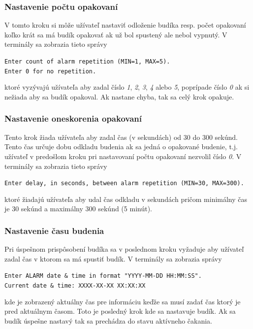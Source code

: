 \documentclass[11pt,a4paper]{article}
\begin{document}
        \subsubsection{Nastavenie počtu opakovaní}

            \indent V tomto kroku si môže užívateľ nastaviť odloženie budíka resp. počet opakovaní koľko krát sa má budík opakovať ak už bol spustený ale nebol vypnutý. V terminály sa zobrazia tieto správy
            \begin{center}
                \texttt{Enter count of alarm repetition (MIN=1, MAX=5).}\\
                \texttt{Enter 0 for no repetition.}
            \end{center}
            ktoré vyzývajú užívateľa aby zadal číslo \textit{1}, \textit{2}, \textit{3}, \textit{4} alebo \textit{5}, poprípade číslo \textit{0} ak si nežiada aby sa budík opakoval. Ak nastane chyba, tak sa celý krok opakuje.

        \subsubsection{Nastavenie oneskorenia opakovaní}

            \indent Tento krok žiada užívateľa aby zadal čas (v sekundách) od 30 do 300 sekúnd. Tento čas určuje dobu odkladu budenia ak sa jedná o opakované budenie, t.j. užívateľ v predošlom kroku pri nastavovaní počtu opakovaní nezvolil číslo \textit{0}. V terminály sa zobrazia tieto správy
            \begin{center}
                \texttt{Enter delay, in seconds, between alarm repetition (MIN=30, MAX=300).}
            \end{center}
            ktoré žiadajú užívateľa aby udal čas odkladu v sekundách pričom minimálny čas je 30 sekúnd a maximálny 300 sekúnd (5 minút).

        \subsubsection{Nastavenie času budenia}

            \indent Pri úspešnom prispôsobení budíka sa v poslednom kroku vyžaduje aby užívateľ zadal čas v ktorom sa má spustiť budík. V terminály sa zobrazia správy
            \begin{center}
                \texttt{Enter ALARM date \& time in format "YYYY-MM-DD HH:MM:SS".}\\
                \texttt{Current date \& time: XXXX-XX-XX XX:XX:XX}
            \end{center}
            kde je zobrazený aktuálny čas pre informáciu keďže sa musí zadať čas ktorý je pred aktuálnym časom. Toto je posledný krok kde sa nastavuje budík. Ak sa budík úspešne nastavý tak sa prechádza do stavu aktívneho čakania.
\end{document}
